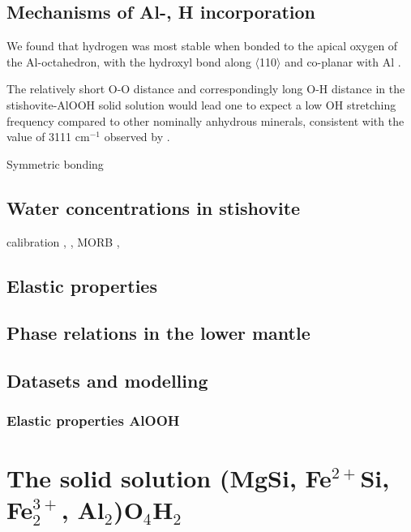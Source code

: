 \documentclass[review]{elsarticle}
\begin{document}


\subsection{Mechanisms of Al-, H incorporation}
We found that hydrogen was most stable when bonded to the apical oxygen of the Al-octahedron, with the hydroxyl bond along $\langle$110$\rangle$ and co-planar with Al \citep{PS2004}.

The relatively short O-O distance and correspondingly long O-H distance in the stishovite-AlOOH solid solution would lead one to expect a low OH stretching frequency compared to other nominally anhydrous minerals, consistent with the value of 3111 cm$^{-1}$ observed by \cite{PMH1993}.

Symmetric bonding \citep{PS2004}






\subsection{Water concentrations in stishovite}
\cite{PMH1993} calibration
\cite{PBJ2003}
\cite{BBB2006},  
\cite{LKSOLBI2007},
MORB \cite{CK2002},


\subsection{Elastic properties}
\cite{Lakshtanovetal2005}
\cite{OSHKKK2002}
\cite{SKNNFUIOY2009}

\subsection{Phase relations in the lower mantle}
\cite{IR1993}
\cite{Wood2000}
\cite{Hirose2002}
\cite{Walteretal2015}
\cite{LO2005}

\subsection{Datasets and modelling}
\cite{HP2011}
\cite{SLB2011}
\cite{CHRU2014}

\subsubsection{Elastic properties AlOOH}
\cite{Suzuki2009}
\citep{SKVO2008}
\cite{VOK2002}
\cite{TT2009}
\cite{LAJ2006}

\section{The solid solution (MgSi, Fe$^{2+}$Si, Fe$^{3+}_2$, Al$_2$)O$_4$H$_2$}
\end{document}
